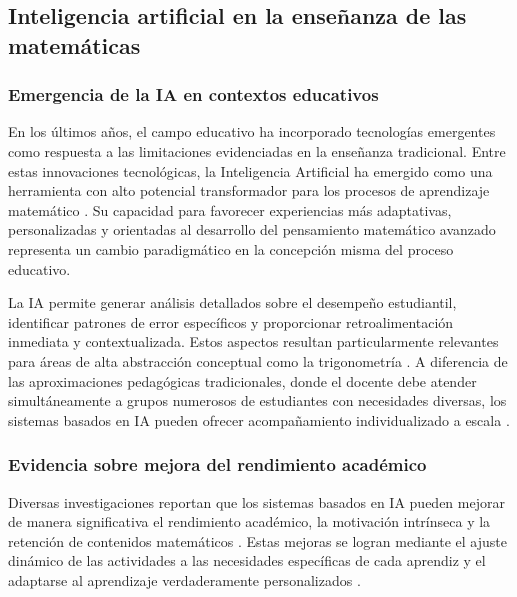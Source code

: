 \subsection{Inteligencia artificial en la enseñanza de las matemáticas}

\subsubsection{Emergencia de la IA en contextos educativos}

En los últimos años, el campo educativo ha incorporado tecnologías emergentes como respuesta a las limitaciones evidenciadas en la enseñanza tradicional. Entre estas innovaciones tecnológicas, la Inteligencia Artificial ha emergido como una herramienta con alto potencial transformador para los procesos de aprendizaje matemático \parencite{panquebanInteligenciaArtificialEducacion2024}. Su capacidad para favorecer experiencias más adaptativas, personalizadas y orientadas al desarrollo del pensamiento matemático avanzado representa un cambio paradigmático en la concepción misma del proceso educativo.

La IA permite generar análisis detallados sobre el desempeño estudiantil, identificar patrones de error específicos y proporcionar retroalimentación inmediata y contextualizada. Estos aspectos resultan particularmente relevantes para áreas de alta abstracción conceptual como la trigonometría \parencite{mirelesAplicacionInteligenciaArtificial2025,hariyantoArtificialIntelligenceAdaptive2025}. A diferencia de las aproximaciones pedagógicas tradicionales, donde el docente debe atender simultáneamente a grupos numerosos de estudiantes con necesidades diversas, los sistemas basados en IA pueden ofrecer acompañamiento individualizado a escala \parencite{suarezDesarrolloHabilidadesCon2023}.

\subsubsection{Evidencia sobre mejora del rendimiento académico}

Diversas investigaciones reportan que los sistemas basados en IA pueden mejorar de manera significativa el rendimiento académico, la motivación intrínseca y la retención de contenidos matemáticos \parencite{calderonmaldonadoInteligenciaArtificialAprendizaje2025,EfectoChatGPTRendimiento2025}. Estas mejoras se logran mediante el ajuste dinámico de las actividades a las necesidades específicas de cada aprendiz y el adaptarse al aprendizaje verdaderamente personalizados \parencite{muirraguiirrazabalImpactoUsoInteligencia2025}.


